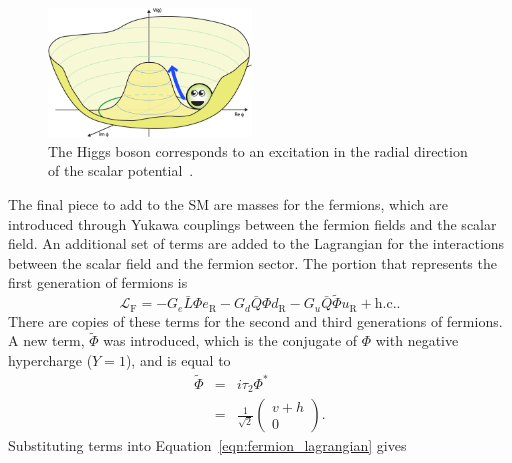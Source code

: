 \begin{figure}[th]
  \centering
  \includegraphics[width=0.48\textwidth]{figs/theory/Higgs-Potential-radial.png}
  \caption{
    The Higgs boson corresponds to an excitation in the radial direction
    of the scalar potential~\cite{QuantumDiariesHiggs}.
  }
  \label{fig:higgs_mass}
\end{figure}

The final piece to add to the SM are masses for the fermions, which are
introduced through Yukawa couplings between the fermion fields and the scalar
field.
An additional set of terms are added to the Lagrangian for the interactions
between the scalar field and the fermion sector.
The portion that represents the first generation of fermions is
\begin{equation}
  \mathcal{L}_\mathrm{F} =
  - G_e \bar{L} \Phi e_\mathrm{R}
  - G_d \bar{Q} \Phi d_\mathrm{R}
  - G_u \bar{Q} \tilde{\Phi} u_\mathrm{R}
  + \mathrm{h.c.}.
  \label{eqn:fermion_lagrangian}
\end{equation}
There are copies of these terms for the second and third generations of
fermions.
A new term, $\tilde{\Phi}$ was introduced, which is the conjugate of $\Phi$
with negative hypercharge ($Y = 1$), and is equal to
\begin{eqnarray}
  \tilde{\Phi} &=& i \tau_2 \Phi^{*} \\
               &=& \frac{1}{\sqrt{2}} \begin{pmatrix} v + h \\ 0 \end{pmatrix}.
\end{eqnarray}
Substituting terms into Equation~\ref{eqn:fermion_lagrangian} gives

